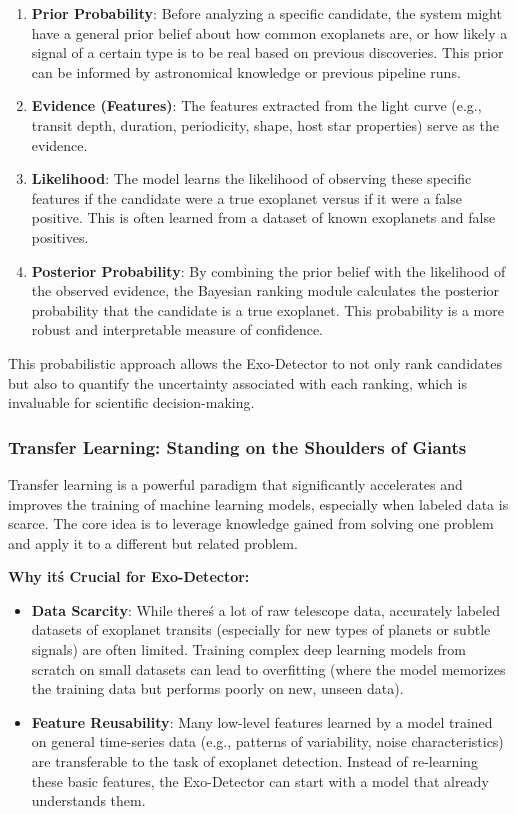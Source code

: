 \documentclass{article}
\begin{document}
\begin{enumerate}
    \item \textbf{Prior Probability}: Before analyzing a specific candidate, the system might have a general prior belief about how common exoplanets are, or how likely a signal of a certain type is to be real based on previous discoveries. This prior can be informed by astronomical knowledge or previous pipeline runs.
    \item \textbf{Evidence (Features)}: The features extracted from the light curve (e.g., transit depth, duration, periodicity, shape, host star properties) serve as the evidence.
    \item \textbf{Likelihood}: The model learns the likelihood of observing these specific features if the candidate were a true exoplanet versus if it were a false positive. This is often learned from a dataset of known exoplanets and false positives.
    \item \textbf{Posterior Probability}: By combining the prior belief with the likelihood of the observed evidence, the Bayesian ranking module calculates the posterior probability that the candidate is a true exoplanet. This probability is a more robust and interpretable measure of confidence.
\end{enumerate}

This probabilistic approach allows the Exo-Detector to not only rank candidates but also to quantify the uncertainty associated with each ranking, which is invaluable for scientific decision-making.

\subsubsection{Transfer Learning: Standing on the Shoulders of Giants}

Transfer learning is a powerful paradigm that significantly accelerates and improves the training of machine learning models, especially when labeled data is scarce. The core idea is to leverage knowledge gained from solving one problem and apply it to a different but related problem.

\textbf{Why it\'s Crucial for Exo-Detector:}

\begin{itemize}
    \item \textbf{Data Scarcity}: While there\'s a lot of raw telescope data, accurately labeled datasets of exoplanet transits (especially for new types of planets or subtle signals) are often limited. Training complex deep learning models from scratch on small datasets can lead to overfitting (where the model memorizes the training data but performs poorly on new, unseen data).
    \item \textbf{Feature Reusability}: Many low-level features learned by a model trained on general time-series data (e.g., patterns of variability, noise characteristics) are transferable to the task of exoplanet detection. Instead of re-learning these basic features, the Exo-Detector can start with a model that already understands them.
\end{itemize}
\end{document}
